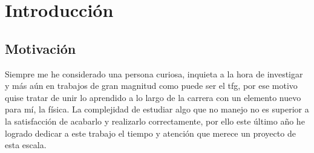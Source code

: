 \documentclass[12pt]{report} %
\begin{document}
\setcounter{page}{5}
	
		
	\vfill
	
	\newpage %
	\thispagestyle{empty}
	\mbox{}
	


\tableofcontents
\thispagestyle{fancy}

\newpage %
\thispagestyle{empty}
\mbox{}

\listoffigures
\thispagestyle{fancy}

\newpage %
\thispagestyle{empty}
\mbox{}

\listoftables
\thispagestyle{fancy}

\newpage %
\thispagestyle{empty}
\mbox{}


\printglossary[type=\acronymtype, title={LISTA DE ABREVIATURAS}, style=long]
\thispagestyle{fancy}

\newpage
\thispagestyle{empty}
\mbox{}

\clearpage
{}

\clearpage
{} %

\chapter{Introducción}

\section{Motivación}

Siempre me he considerado una persona curiosa, inquieta a la hora de investigar y más aún en trabajos de gran magnitud como puede ser el \gls{tfg}, por ese motivo quise tratar de unir lo aprendido a lo largo de la carrera con un elemento nuevo para mí, la física. La complejidad de estudiar algo que no manejo no es superior a la satisfacción de acabarlo y realizarlo correctamente, por ello este último año he logrado dedicar a este trabajo el tiempo y atención que merece un proyecto de esta escala.
\end{document}
